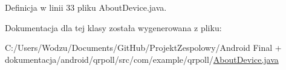 Definicja w linii 33 pliku About\+Device.\+java.



Dokumentacja dla tej klasy została wygenerowana z pliku\+:\begin{DoxyCompactItemize}
\item 
C\+:/\+Users/\+Wodzu/\+Documents/\+Git\+Hub/\+Projekt\+Zespolowy/\+Android Final + dokumentacja/android/qrpoll/src/com/example/qrpoll/\hyperlink{_about_device_8java}{About\+Device.\+java}\end{DoxyCompactItemize}
